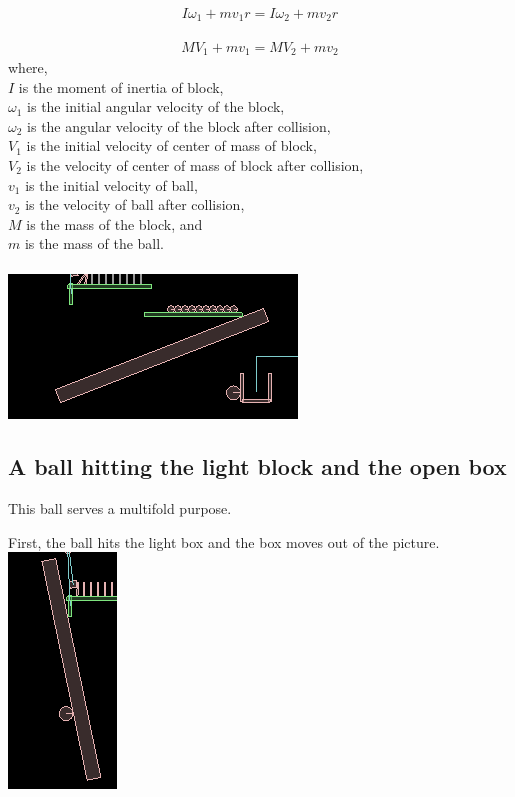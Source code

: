 \documentclass[11pt]{article}
\begin{document}
\begin{align}
I\omega_1 + mv_1r = I\omega_2 + mv_2r 
\end{align}

\begin{align}
MV_1 + mv_1 = MV_2 + mv_2
\end{align}
where,\\
$I$ is the moment of inertia of block,\\
$\omega_1$ is the initial angular velocity of the block,\\
$\omega_2$ is the angular velocity of the block after collision,\\
$V_1$ is the initial velocity of center of mass of block,\\
$V_2$ is the velocity of center of mass of block after collision,\\
$v_1$ is the initial velocity of ball,\\
$v_2$ is the velocity of ball after collision,\\
$M$ is the mass of the block, and\\
$m$ is the mass of the ball.\\
\cite{hcv}\\

\includegraphics[scale=0.7,natwidth=290,natheight=145]{./22.png}

\pagebreak

\subsection{A ball hitting the light block and the open box}

This ball serves a multifold purpose. 

First, the ball hits the light box and the box moves out of the picture.\\

\includegraphics[scale=0.7,natwidth=109,natheight=237]{./31.png}
\end{document}
